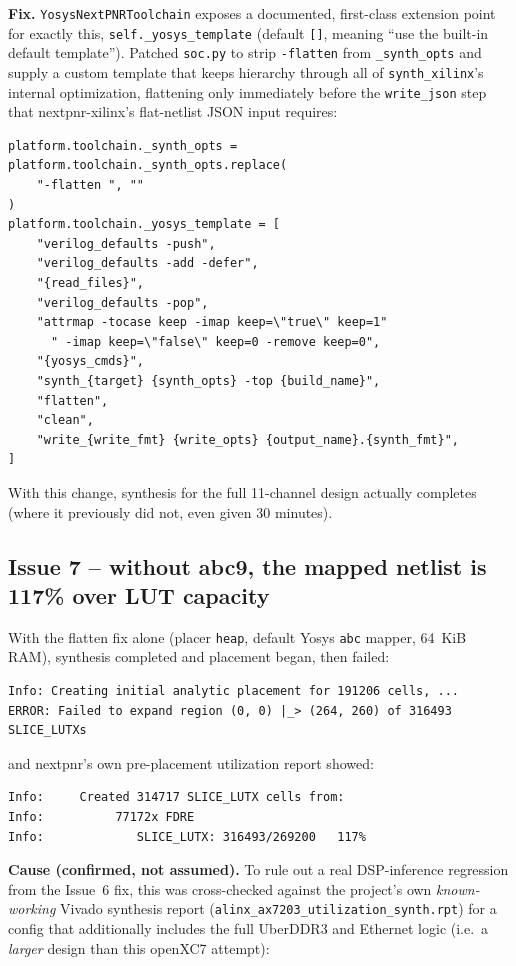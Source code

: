 \documentclass[11pt]{article}
\begin{document}
\textbf{Fix.} \lstinline{YosysNextPNRToolchain} exposes a documented,
first-class extension point for exactly this,
\lstinline{self._yosys_template} (default \lstinline{[]}, meaning ``use
the built-in default template''). Patched \lstinline{soc.py} to strip
\lstinline{-flatten} from \lstinline{_synth_opts} and supply a custom
template that keeps hierarchy through all of \lstinline{synth_xilinx}'s
internal optimization, flattening only immediately before the
\lstinline{write_json} step that nextpnr-xilinx's flat-netlist JSON input
requires:
\begin{lstlisting}[style=codeblk]
platform.toolchain._synth_opts = platform.toolchain._synth_opts.replace(
    "-flatten ", ""
)
platform.toolchain._yosys_template = [
    "verilog_defaults -push",
    "verilog_defaults -add -defer",
    "{read_files}",
    "verilog_defaults -pop",
    "attrmap -tocase keep -imap keep=\"true\" keep=1"
      " -imap keep=\"false\" keep=0 -remove keep=0",
    "{yosys_cmds}",
    "synth_{target} {synth_opts} -top {build_name}",
    "flatten",
    "clean",
    "write_{write_fmt} {write_opts} {output_name}.{synth_fmt}",
]
\end{lstlisting}
With this change, synthesis for the full 11-channel design actually
completes (where it previously did not, even given 30 minutes).

\subsection{Issue 7 -- without abc9, the mapped netlist is 117\% over LUT
capacity}

With the flatten fix alone (placer \lstinline{heap}, default Yosys
\lstinline{abc} mapper, 64~KiB RAM), synthesis completed and placement
began, then failed:
\begin{lstlisting}[style=termout]
Info: Creating initial analytic placement for 191206 cells, ...
ERROR: Failed to expand region (0, 0) |_> (264, 260) of 316493 SLICE_LUTXs
\end{lstlisting}
and nextpnr's own pre-placement utilization report showed:
\begin{lstlisting}[style=termout]
Info:     Created 314717 SLICE_LUTX cells from:
Info:          77172x FDRE
Info: 	          SLICE_LUTX: 316493/269200   117%
\end{lstlisting}

\textbf{Cause (confirmed, not assumed).} To rule out a real DSP-inference
regression from the Issue~6 fix, this was cross-checked against the
project's own \emph{known-working} Vivado synthesis report
(\lstinline{alinx_ax7203_utilization_synth.rpt}) for a config that
additionally includes the full UberDDR3 and Ethernet logic (i.e.\ a
\emph{larger} design than this openXC7 attempt):
\end{document}
